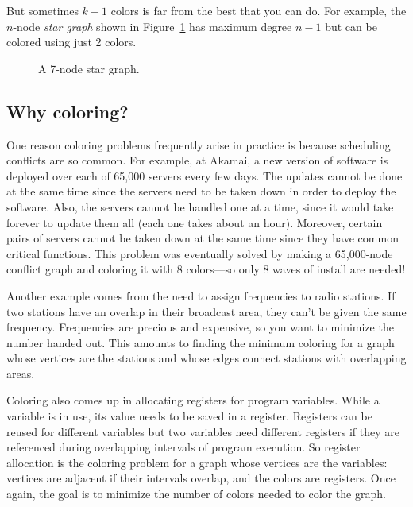But sometimes $k+1$ colors is far from the best that you can do.
For example, the $n$-node \emph{star graph} shown in
Figure~\ref{fig:5T} has maximum degree $n - 1$ but can be colored
using just 2 colors.

\begin{figure}


\caption{A 7-node star graph.}

\label{fig:5T}

\end{figure}


\subsection{Why coloring?}

One reason coloring problems frequently arise in practice is because
scheduling conflicts are so common.  For example, at Akamai, a new
version of software is deployed over each of 65,000 servers every few
days.  The updates cannot be done at the same time since the servers
need to be taken down in order to deploy the software.  Also, the
servers cannot be handled one at a time, since it would take forever
to update them all (each one takes about an hour).  Moreover, certain
pairs of servers cannot be taken down at the same time since they have
common critical functions.  This problem was eventually solved by
making a 65,000-node conflict graph and coloring it with 8 colors---so
only 8 waves of install are needed!

Another example comes from the need to assign frequencies to radio
stations.  If two stations have an overlap in their broadcast area, they
can't be given the same frequency.  Frequencies are precious and
expensive, so you want to minimize the number handed out.  This amounts to
finding the minimum coloring for a graph whose vertices are the stations
and whose edges connect stations with overlapping areas.

Coloring also comes up in allocating registers for program variables.
While a variable is in use, its value needs to be saved in a register.
Registers can be reused for different variables but two variables need
different registers if they are referenced during overlapping
intervals of program execution.  So register allocation is the
coloring problem for a graph whose vertices are the variables:
vertices are adjacent if their intervals overlap, and the colors are
registers.  Once again, the goal is to minimize the number of colors
needed to color the graph.

